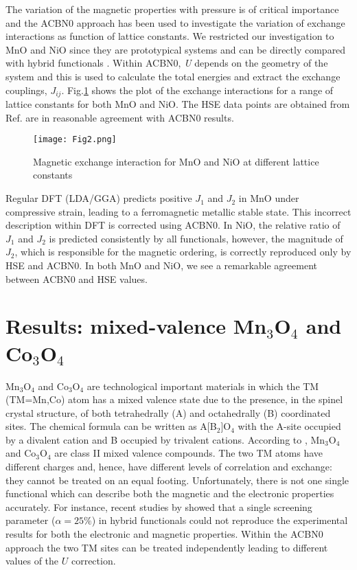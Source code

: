 \documentclass[12pt,a4paper,final]{iopart}
\begin{document}
The variation of the magnetic properties with pressure is of critical importance and the ACBN0 approach has been used to investigate  the variation of exchange interactions as function of lattice constants. We restricted our investigation to MnO and NiO since they are prototypical systems and  can be directly compared  with hybrid functionals \cite{archer2011exchange}. Within ACBN0, \textit{U} depends on the geometry of the system\cite{gopal2015improved} and this is used to calculate the total energies and extract the exchange couplings, $J_{ij}$. Fig.\ref{fig:mag-press} shows the plot of the exchange interactions for a range of lattice constants for both MnO and NiO. The HSE data points are obtained from Ref.\cite{archer2011exchange} are in reasonable agreement with ACBN0 results.

\begin{figure}[htb!]
\footnotesize
\centering
\captionsetup{width=\linewidth}
\texttt{[image: Fig2.png]}
\caption{\small{Magnetic exchange interaction for MnO and NiO at different lattice constants}}
\label{fig:mag-press}
\end{figure}

Regular DFT (LDA/GGA) predicts positive  $J_1$ and $J_2$  in MnO under compressive strain, leading to a ferromagnetic metallic stable state. This incorrect description within DFT is corrected using ACBN0. 
In NiO, the relative ratio of $J_1$ and $J_2$ is predicted consistently by all functionals, however,  the magnitude of $J_2$, which is responsible for the magnetic ordering, is correctly reproduced only by HSE and ACBN0.
In both MnO and NiO, we see a remarkable agreement between ACBN0 and HSE values. 

\section{Results: mixed-valence Mn$_3$O$_4$ and Co$_3$O$_4$}
\label{sec:resultsMV}

Mn$_3$O$_4$ and Co$_3$O$_4$ are technological important materials in which the TM (TM=Mn,Co) atom has a mixed valence state due to the presence, in the spinel crystal structure, of both tetrahedrally (A) and octahedrally (B) coordinated sites.  The chemical formula can be written as A[B$_2$]O$_4$ with the A-site occupied by a divalent cation and B occupied by trivalent cations. According to \cite{robin1968mixed}, Mn$_3$O$_4$ and Co$_3$O$_4$ are  class II mixed valence compounds. The two TM atoms  have different charges and, hence, have different levels of correlation and exchange: they cannot be treated on an equal footing.  Unfortunately, there is not one single functional which can describe both the magnetic and the electronic properties accurately. For instance, recent studies by \cite{singh2014putting} showed that a single screening parameter ($\alpha=25\%$) in hybrid functionals could not reproduce the experimental results for both the electronic and magnetic properties. Within the ACBN0 approach the two TM sites can be treated independently leading to different values of the $U$ correction.
\end{document}
